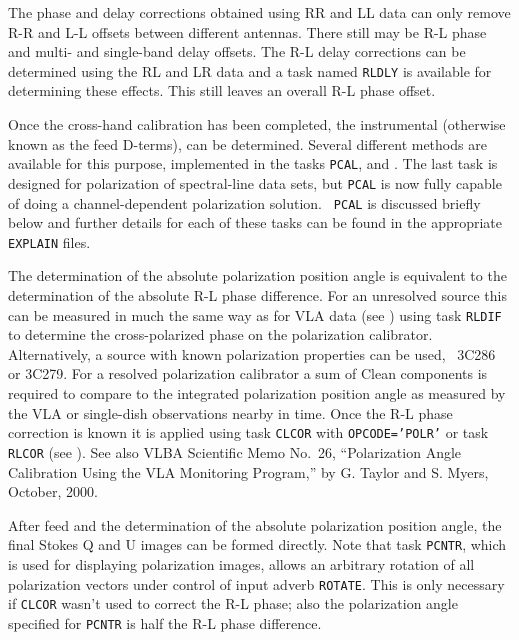The phase and delay corrections obtained using RR and LL data can only
remove R-R and L-L offsets between different antennas.  There still
may be R-L phase and multi- and single-band delay offsets. The R-L
delay corrections can be determined using the RL and LR data and a
task named {\tt RLDLY} is available for determining these effects.
This still leaves an overall R-L phase offset.

Once the cross-hand calibration has been completed, the instrumental
 (otherwise known as the feed D-terms), can be
determined.  Several different methods are available for this purpose,
implemented in the tasks {\tt PCAL}, {\tt {}} and
{\tt {}}\@.   The last task is designed for polarization
 of spectral-line data sets, but {\tt PCAL} is now
fully capable of doing a channel-dependent polarization solution. {\tt
PCAL} is discussed briefly below and further details for each of these
tasks can be found in the appropriate {\tt EXPLAIN} files.

The determination of the absolute polarization position angle is
equivalent to the determination of the absolute R-L phase difference.
For an unresolved source this can be measured in much the same way as
for VLA data (see ) using task {\tt RLDIF} to determine
the cross-polarized phase on the polarization calibrator.
Alternatively, a source with known polarization properties can be
used, \eg\ 3C286 or 3C279.  For a resolved polarization calibrator a
sum of Clean components is required to compare to the integrated
polarization position angle as measured by the VLA or single-dish
observations nearby in time. Once the R-L phase correction is known it
is applied using task {\tt CLCOR} with {\tt OPCODE='POLR'} or task
{\tt RLCOR} (see ).  See also VLBA Scientific Memo No.~26,
``Polarization Angle Calibration Using the VLA Monitoring Program,''
by G. Taylor and S. Myers, October, 2000.

After feed  and the determination of the absolute
polarization position angle, the final Stokes Q and U images can be
formed directly. Note that task {\tt PCNTR}, which is used for
displaying polarization images, allows an arbitrary rotation of all
polarization vectors under control of input adverb {\tt ROTATE}\@.
This is only necessary if {\tt CLCOR} wasn't used to correct the R-L
phase; also the polarization angle specified for {\tt PCNTR} is half
the R-L phase difference.

